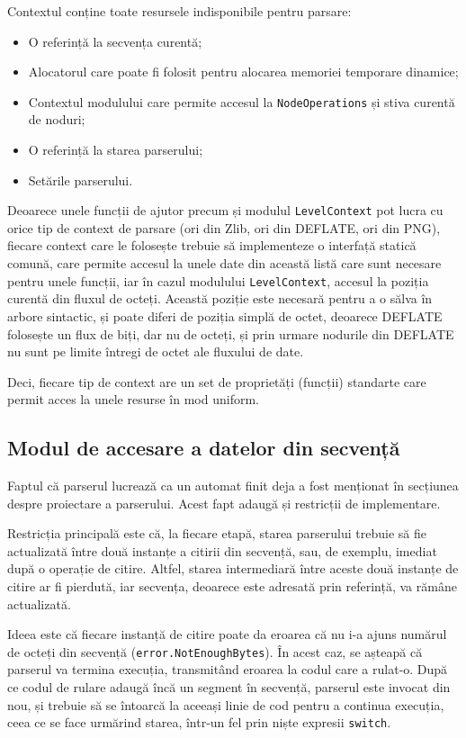 \documentclass[a4paper,12pt]{report}
\begin{document}
Contextul conține toate resursele indisponibile pentru parsare:
\begin{itemize}
    \item O referință la secvența curentă;
    \item Alocatorul care poate fi folosit pentru alocarea memoriei temporare dinamice;
    \item Contextul modulului care permite accesul la \texttt{NodeOperations} și stiva curentă de noduri;
    \item O referință la starea parserului;
    \item Setările parserului.
\end{itemize}

Deoarece unele funcții de ajutor precum și modulul \texttt{LevelContext}
pot lucra cu orice tip de context de parsare (ori din Zlib, ori din DEFLATE, ori din \ac{PNG}),
fiecare context care le folosește trebuie să implementeze o interfață statică comună,
care permite accesul la unele date din această listă care sunt necesare pentru unele funcții,
iar în cazul modulului \texttt{LevelContext},
accesul la poziția curentă din fluxul de octeți.
Această poziție este necesară pentru a o sălva în arbore sintactic,
și poate diferi de poziția simplă de octet,
deoarece DEFLATE folosește un flux de biți, dar nu de octeți,
și prin urmare nodurile din DEFLATE nu sunt pe limite întregi de octet ale fluxului de date.

Deci, fiecare tip de context are un set de proprietăți (funcții) standarte
care permit acces la unele resurse în mod uniform.


\subsection{Modul de accesare a datelor din secvență}

Faptul că parserul lucrează ca un automat finit deja a fost
menționat în secțiunea despre proiectare a parserului.
Acest fapt adaugă și restricții de implementare.

Restricția principală este că, la fiecare etapă, starea parserului trebuie să fie actualizată
între două instanțe a citirii din secvență, sau, de exemplu, imediat după o operație de citire.
Altfel, starea intermediară între aceste două instanțe de citire ar fi pierdută,
iar secvența, deoarece este adresată prin referință, va rămâne actualizată.

Ideea este că fiecare instanță de citire poate da eroarea
că nu i-a ajuns numărul de octeți din secvență (\texttt{error.NotEnoughBytes}).
În acest caz, se așteapă că parserul va termina execuția,
transmitând eroarea la codul care a rulat-o.
După ce codul de rulare adaugă încă un segment în secvență,
parserul este invocat din nou, și trebuie să se întoarcă
la aceeași linie de cod pentru a continua execuția,
ceea ce se face urmărind starea, într-un fel prin niște expresii \texttt{switch}.
\end{document}
